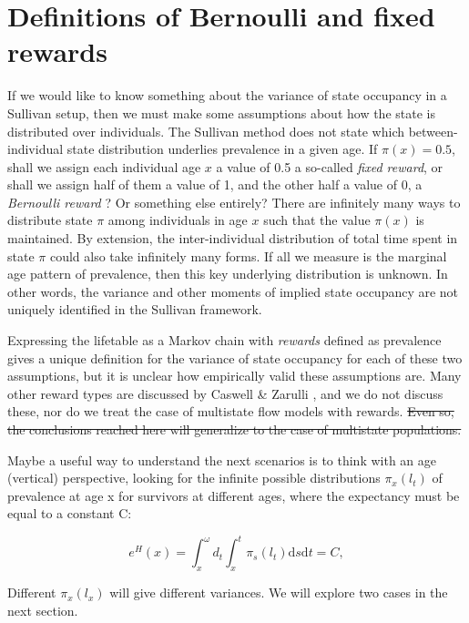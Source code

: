 \documentclass{bmcart}
\begin{document}
\section{Definitions of Bernoulli and fixed rewards}
If we would like to know something about the variance of state occupancy in a Sullivan setup, then we must make some assumptions about how the state is distributed over individuals. The Sullivan method does not state which between-individual state distribution underlies prevalence in a given age. If $\pi(x) = 0.5$, shall we assign each individual age $x$ a value of 0.5 a so-called \emph{fixed reward}, or shall we assign half of them a value of 1, and the other half a value of 0, a \emph{Bernoulli reward} \citep{caswell2018matrix}? Or something else entirely? There are infinitely many ways to distribute state $\pi$ among individuals in age $x$ such that the value $\pi(x)$ is maintained. By extension, the inter-individual distribution of total time spent in state $\pi$ could also take infinitely many forms. If all we measure is the marginal age pattern of prevalence, then this key underlying distribution is unknown. In other words, the variance and other moments of implied state occupancy are not uniquely identified in the Sullivan framework. 

Expressing the lifetable as a Markov chain with \emph{rewards} defined as prevalence gives a unique definition for the variance of state occupancy for each of these two assumptions, but it is unclear how empirically valid these assumptions are. Many other reward types are discussed by Caswell \& Zarulli \cite{caswell2018matrix}, and we do not discuss these, nor do we treat the case of multistate flow models with rewards. \sout{Even so, the conclusions reached here will generalize to the case of multistate populations.}

Maybe a useful way to understand the next scenarios is to think with an age (vertical) perspective, looking for the infinite possible distributions $\pi_x(l_t)$ of prevalence at age x for survivors at different ages, where the expectancy must be equal to a constant C:

\begin{equation}
\label{eq:formalexamples}
e^H(x) = \int_{x}^{\omega}{d_t \int_{x}^{t}{\pi_s(l_t)\mathrm{d}s}\mathrm{d}t} = C \mathrm{,}
\end{equation}

Different $\pi_x(l_x)$ will give different variances. We will explore two cases in the next section.
\end{document}
